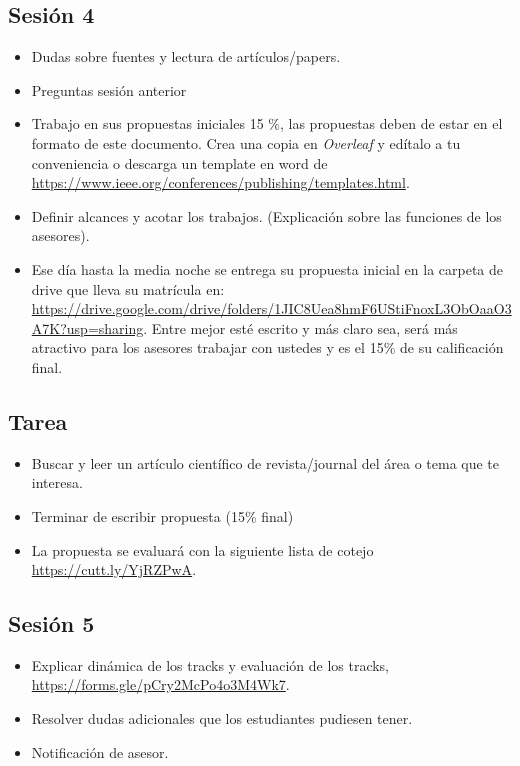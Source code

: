 \documentclass[letterpaper, 10 pt, conference]{ieeeconf}  %
\begin{document}
\subsection{Sesión 4}
\begin{itemize}
		\item Dudas sobre fuentes y lectura de artículos/papers.
		\item Preguntas sesión anterior
		\item Trabajo en sus propuestas iniciales 15 \%, las propuestas deben de estar en el formato de este documento. Crea una copia en \textit{Overleaf} y edítalo a tu conveniencia o descarga un template en word de  \url{https://www.ieee.org/conferences/publishing/templates.html}.
		\item Definir alcances y acotar los trabajos. (Explicación sobre las funciones de los asesores).
		\item Ese día hasta la media noche se entrega su propuesta inicial en la carpeta de drive que lleva su matrícula en: \url{https://drive.google.com/drive/folders/1JIC8Uea8hmF6UStiFnoxL3ObOaaO3A7K?usp=sharing}. Entre mejor esté escrito y más claro sea, será más atractivo para los asesores trabajar con ustedes y es el 15\% de su calificación final.
\end{itemize}

\subsection*{Tarea} 
\begin{itemize}
	\item Buscar y leer un artículo científico de revista/journal del área o tema que te interesa.
	\item Terminar de escribir propuesta (15\% final)
    \item La propuesta se evaluará con la siguiente lista de cotejo \url{https://cutt.ly/YjRZPwA}.
\end{itemize}

\subsection{Sesión 5}
\begin{itemize}
		\item Explicar dinámica de los tracks y evaluación de los tracks, \url{https://forms.gle/pCry2McPo4o3M4Wk7}.
		\item Resolver dudas adicionales que los estudiantes pudiesen tener.
		\item Notificación de asesor.
\end{itemize}
\end{document}
